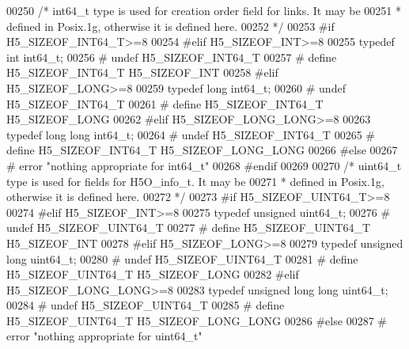 \begin{DoxyCode}
{{{00250 \textcolor{comment}{/* int64\_t type is used for creation order field for links.  It may be}
00251 \textcolor{comment}{ * defined in Posix.1g, otherwise it is defined here.}
00252 \textcolor{comment}{ */}
00253 \textcolor{preprocessor}{#if H5\_SIZEOF\_INT64\_T>=8}
00254 \textcolor{preprocessor}{#elif H5\_SIZEOF\_INT>=8}
00255     \textcolor{keyword}{typedef} \textcolor{keywordtype}{int} int64\_t;
00256 \textcolor{preprocessor}{#   undef H5\_SIZEOF\_INT64\_T}
00257 \textcolor{preprocessor}{#   define H5\_SIZEOF\_INT64\_T H5\_SIZEOF\_INT}
00258 \textcolor{preprocessor}{#elif H5\_SIZEOF\_LONG>=8}
00259     \textcolor{keyword}{typedef} \textcolor{keywordtype}{long} int64\_t;
00260 \textcolor{preprocessor}{#   undef H5\_SIZEOF\_INT64\_T}
00261 \textcolor{preprocessor}{#   define H5\_SIZEOF\_INT64\_T H5\_SIZEOF\_LONG}
00262 \textcolor{preprocessor}{#elif H5\_SIZEOF\_LONG\_LONG>=8}
00263     \textcolor{keyword}{typedef} \textcolor{keywordtype}{long} \textcolor{keywordtype}{long} int64\_t;
00264 \textcolor{preprocessor}{#   undef H5\_SIZEOF\_INT64\_T}
00265 \textcolor{preprocessor}{#   define H5\_SIZEOF\_INT64\_T H5\_SIZEOF\_LONG\_LONG}
00266 \textcolor{preprocessor}{#else}
00267 \textcolor{preprocessor}{#   error "nothing appropriate for int64\_t"}
00268 \textcolor{preprocessor}{#endif}
00269 
00270 \textcolor{comment}{/* uint64\_t type is used for fields for H5O\_info\_t.  It may be}
00271 \textcolor{comment}{ * defined in Posix.1g, otherwise it is defined here.}
00272 \textcolor{comment}{ */}
00273 \textcolor{preprocessor}{#if H5\_SIZEOF\_UINT64\_T>=8}
00274 \textcolor{preprocessor}{#elif H5\_SIZEOF\_INT>=8}
00275     \textcolor{keyword}{typedef} \textcolor{keywordtype}{unsigned} uint64\_t;
00276 \textcolor{preprocessor}{#   undef H5\_SIZEOF\_UINT64\_T}
00277 \textcolor{preprocessor}{#   define H5\_SIZEOF\_UINT64\_T H5\_SIZEOF\_INT}
00278 \textcolor{preprocessor}{#elif H5\_SIZEOF\_LONG>=8}
00279     \textcolor{keyword}{typedef} \textcolor{keywordtype}{unsigned} \textcolor{keywordtype}{long} uint64\_t;
00280 \textcolor{preprocessor}{#   undef H5\_SIZEOF\_UINT64\_T}
00281 \textcolor{preprocessor}{#   define H5\_SIZEOF\_UINT64\_T H5\_SIZEOF\_LONG}
00282 \textcolor{preprocessor}{#elif H5\_SIZEOF\_LONG\_LONG>=8}
00283     \textcolor{keyword}{typedef} \textcolor{keywordtype}{unsigned} \textcolor{keywordtype}{long} \textcolor{keywordtype}{long} uint64\_t;
00284 \textcolor{preprocessor}{#   undef H5\_SIZEOF\_UINT64\_T}
00285 \textcolor{preprocessor}{#   define H5\_SIZEOF\_UINT64\_T H5\_SIZEOF\_LONG\_LONG}
00286 \textcolor{preprocessor}{#else}
00287 \textcolor{preprocessor}{#   error "nothing appropriate for uint64\_t"}
}}}
\end{DoxyCode}

